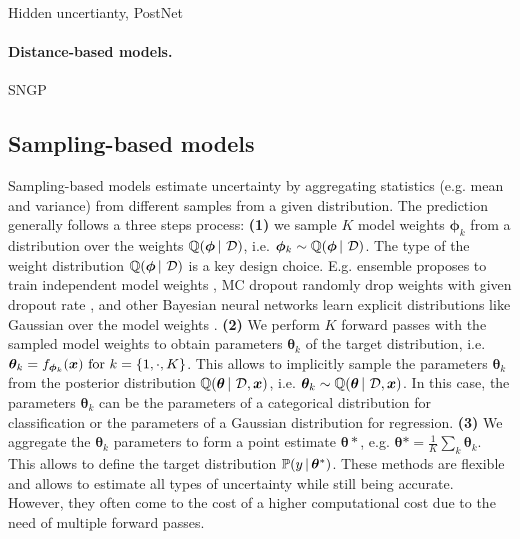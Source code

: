 Hidden uncertianty, PostNet

\paragraph*{Distance-based models.} SNGP


\subsection{Sampling-based models}

Sampling-based models estimate uncertainty by aggregating statistics (e.g. mean and variance) from different samples from a given distribution. The prediction generally follows a three steps process:
\textbf{(1)} we sample $K$ model weights $\bm{\phi}_k$ from a distribution over the weights $\operatorname{\mathbb{Q}}(\bm{\phi} \,|\, \operatorname{\mathcal{D}})$, i.e. $\bm{\phi}_k \sim \operatorname{\mathbb{Q}}(\bm{\phi} \,|\, \operatorname{\mathcal{D}})$. The type of the weight distribution $\operatorname{\mathbb{Q}}(\bm{\phi} \,|\, \operatorname{\mathcal{D}})$ is a key design choice. E.g. ensemble proposes to train independent model weights \cite{ensembles}, MC dropout randomly drop weights with given dropout rate \cite{dropout}, and other Bayesian neural networks learn explicit distributions like Gaussian over the model weights \cite{bayesian-networks}. \textbf{(2)} We perform $K$ forward passes with the sampled model weights to obtain parameters $\bm{\theta}_k$ of the target distribution, i.e. $\bm{\theta}_k = f_{\bm{\phi}_k}(\bm{x}) \text{ for } k=\{1,\cdot,K\}$. This allows to implicitly sample the parameters $\bm{\theta}_k$ from the posterior distribution $\operatorname{\mathbb{Q}}(\bm{\theta} \,|\, \operatorname{\mathcal{D}}, \bm{x})$, i.e. $\bm{\theta}_k \sim \operatorname{\mathbb{Q}}(\bm{\theta} \,|\, \operatorname{\mathcal{D}}, \bm{x})$. In this case, the parameters $\bm{\theta}_k$ can be the parameters of a categorical distribution for classification or the parameters of a Gaussian distribution for regression. \textbf{(3)} We aggregate the $\bm{\theta}_k$ parameters to form a point estimate $\bm{\theta}*$, e.g. $\bm{\theta}*=\frac{1}{K}\sum_k \bm{\theta}_k$. This allows to define the target distribution $\mathbb{P}(y \,|\, \bm{\theta}^*)$. These methods are flexible and allows to estimate all types of uncertainty while still being accurate. However, they often come to the cost of a higher computational cost due to the need of multiple forward passes.

